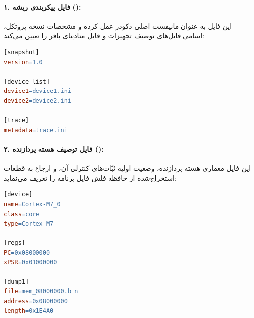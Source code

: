\paragraph*{۱. فایل پیکربندی ریشه ():}
این فایل به عنوان مانیفست اصلی دکودر عمل کرده و مشخصات نسخه پروتکل، اسامی فایل‌های توصیف تجهیزات و فایل متادیتای بافر را تعیین می‌کند:
\begin{latin}
\begin{lstlisting}[language=make, caption={\rl{محتوای فایل مانیفست ریشه} \lr{\texttt{snapshot.ini}}}]
[snapshot]
version=1.0

[device_list]
device1=device1.ini
device2=device2.ini

[trace]
metadata=trace.ini
\end{lstlisting}
\end{latin}

\paragraph*{۲. فایل توصیف هسته پردازنده ():}
این فایل معماری هسته پردازنده، وضعیت اولیه ثبّات‌های کنترلی آن، و ارجاع به قطعات استخراج‌شده از حافظه فلش فایل  برنامه را تعریف می‌نماید:
\begin{latin}
\begin{lstlisting}[language=make, caption={\rl{محتوای فایل توصیف هسته} \lr{\texttt{device1.ini}}}]
[device]
name=Cortex-M7_0
class=core
type=Cortex-M7

[regs]
PC=0x08000000
xPSR=0x01000000

[dump1]
file=mem_08000000.bin
address=0x08000000
length=0x1E4A0
\end{lstlisting}
\end{latin}

